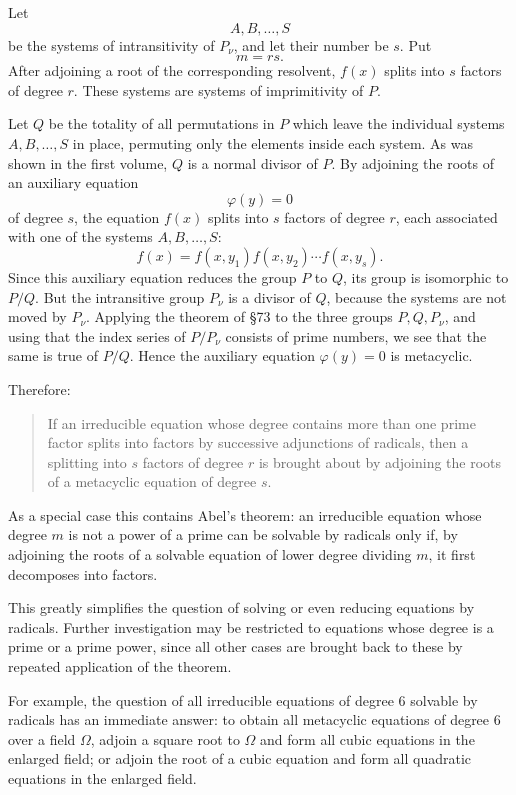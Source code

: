 \documentclass[11pt,a4paper]{book}
\begin{document}
Let
\[
 A,B,\ldots,S
\]
be the systems of intransitivity of \(P_\nu\), and let their number be \(s\).  Put
\[
 m=rs.
\]
After adjoining a root of the corresponding resolvent, \(f(x)\) splits into \(s\) factors of degree \(r\).  These systems are systems of imprimitivity of \(P\).

Let \(Q\) be the totality of all permutations in \(P\) which leave the individual systems \(A,B,\ldots,S\) in place, permuting only the elements inside each system.  As was shown in the first volume, \(Q\) is a normal divisor of \(P\).  By adjoining the roots of an auxiliary equation
\[
 \varphi(y)=0
\]
of degree \(s\), the equation \(f(x)\) splits into \(s\) factors of degree \(r\), each associated with one of the systems \(A,B,\ldots,S\):
\[
 f(x)=f(x,y_1)f(x,y_2)\cdots f(x,y_s).
\]
Since this auxiliary equation reduces the group \(P\) to \(Q\), its group is isomorphic to \(P/Q\).  But the intransitive group \(P_\nu\) is a divisor of \(Q\), because the systems are not moved by \(P_\nu\).  Applying the theorem of \S 73 to the three groups \(P,Q,P_\nu\), and using that the index series of \(P/P_\nu\) consists of prime numbers, we see that the same is true of \(P/Q\).  Hence the auxiliary equation \(\varphi(y)=0\) is metacyclic.

Therefore:

\begin{quote}
If an irreducible equation whose degree contains more than one prime factor splits into factors by successive adjunctions of radicals, then a splitting into \(s\) factors of degree \(r\) is brought about by adjoining the roots of a metacyclic equation of degree \(s\).
\end{quote}

As a special case this contains Abel's theorem: an irreducible equation whose degree \(m\) is not a power of a prime can be solvable by radicals only if, by adjoining the roots of a solvable equation of lower degree dividing \(m\), it first decomposes into factors.

This greatly simplifies the question of solving or even reducing equations by radicals.  Further investigation may be restricted to equations whose degree is a prime or a prime power, since all other cases are brought back to these by repeated application of the theorem.

For example, the question of all irreducible equations of degree \(6\) solvable by radicals has an immediate answer: to obtain all metacyclic equations of degree \(6\) over a field \(\Omega\), adjoin a square root to \(\Omega\) and form all cubic equations in the enlarged field; or adjoin the root of a cubic equation and form all quadratic equations in the enlarged field.
\end{document}
